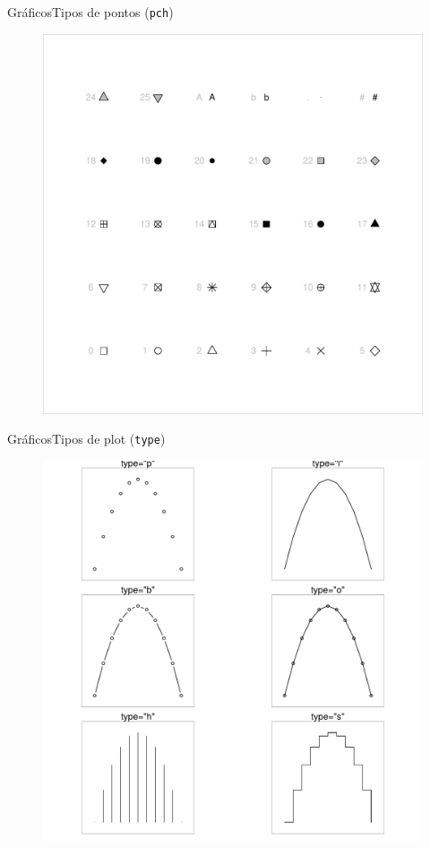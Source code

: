 \documentclass[10pt]{beamer}\usepackage[]{graphicx}\usepackage[]{color}
\begin{document}
\begin{frame}[fragile]{Gráficos}{Tipos de pontos (\texttt{pch})}
\begin{figure}[htp]
\centering
\includegraphics[height=1\textheight]{figure/fig5m}
\end{figure}
\end{frame}

\begin{frame}[fragile]{Gráficos}{Tipos de plot (\texttt{type})}
\begin{figure}[htp]
\centering
\includegraphics[height=0.95\textheight]{figure/fig6m}
\end{figure}
\end{frame}
\end{document}
